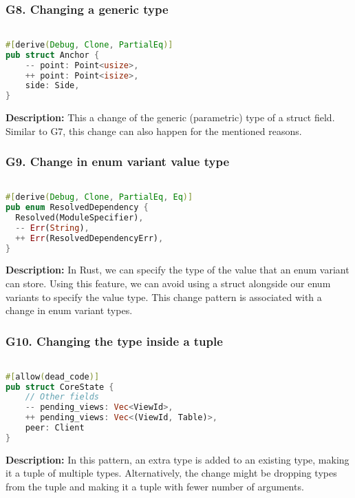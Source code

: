 \subsubsection{G8. Changing a generic type}

\begin{lstlisting}[language=Rust, style=colouredRust, label={l3}]

#[derive(Debug, Clone, PartialEq)]
pub struct Anchor {
    -- point: Point<usize>,
    ++ point: Point<isize>,
    side: Side,
}

\end{lstlisting}

\noindent \textbf{Description:} This a change of the generic (parametric) type of a struct field. Similar to G7, this change can also happen for the mentioned reasons.

\subsubsection{G9. Change in enum variant value type}

\begin{lstlisting}[language=Rust, style=colouredRust, label={l3}]

#[derive(Debug, Clone, PartialEq, Eq)]
pub enum ResolvedDependency {
  Resolved(ModuleSpecifier),
  -- Err(String),
  ++ Err(ResolvedDependencyErr),
}

\end{lstlisting}

\noindent \textbf{Description:} In Rust, we can specify the type of the value that an enum variant can store. Using this feature, we can avoid using a struct alongside our enum variants to specify the value type. This change pattern is associated with a change in enum variant types.

\subsubsection{G10. Changing the type inside a tuple}

\begin{lstlisting}[language=Rust, style=colouredRust, label={l3}]

#[allow(dead_code)]
pub struct CoreState {
    // Other fields
    -- pending_views: Vec<ViewId>,
    ++ pending_views: Vec<(ViewId, Table)>,
    peer: Client
}

\end{lstlisting}

\noindent \textbf{Description:} In this pattern, an extra type is added to an existing type, making it a tuple of multiple types. Alternatively, the change might be dropping types from the tuple and making it a tuple with fewer number of arguments.

